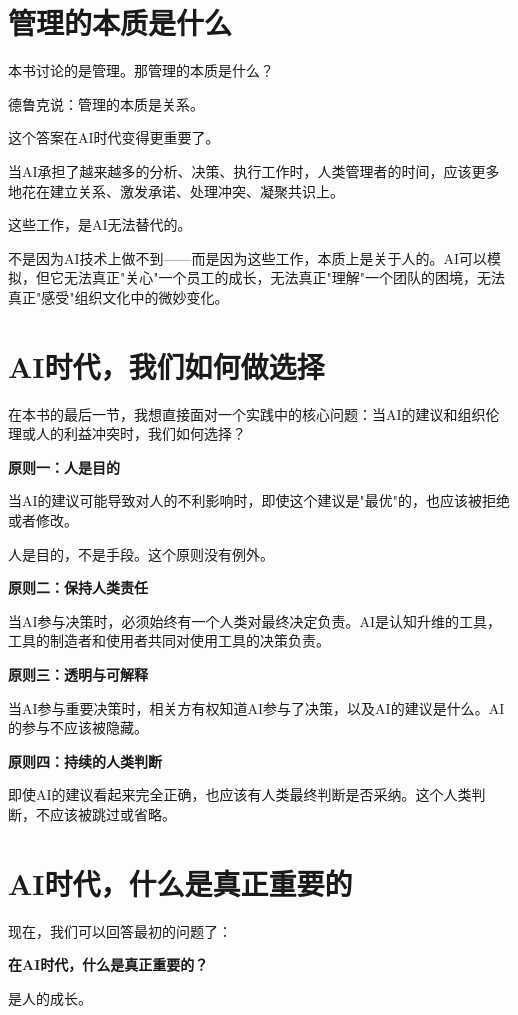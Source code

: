 \section{管理的本质是什么}


本书讨论的是管理。那管理的本质是什么？

德鲁克说：管理的本质是关系。

这个答案在AI时代变得更重要了。

当AI承担了越来越多的分析、决策、执行工作时，人类管理者的时间，应该更多地花在建立关系、激发承诺、处理冲突、凝聚共识上。

这些工作，是AI无法替代的。

不是因为AI技术上做不到——而是因为这些工作，本质上是关于人的。AI可以模拟，但它无法真正"关心"一个员工的成长，无法真正"理解"一个团队的困境，无法真正"感受"组织文化中的微妙变化。

\section{AI时代，我们如何做选择}


在本书的最后一节，我想直接面对一个实践中的核心问题：当AI的建议和组织伦理或人的利益冲突时，我们如何选择？

\textbf{原则一：人是目的}

当AI的建议可能导致对人的不利影响时，即使这个建议是"最优"的，也应该被拒绝或者修改。

人是目的，不是手段。这个原则没有例外。

\textbf{原则二：保持人类责任}

当AI参与决策时，必须始终有一个人类对最终决定负责。AI是认知升维的工具，工具的制造者和使用者共同对使用工具的决策负责。

\textbf{原则三：透明与可解释}

当AI参与重要决策时，相关方有权知道AI参与了决策，以及AI的建议是什么。AI的参与不应该被隐藏。

\textbf{原则四：持续的人类判断}

即使AI的建议看起来完全正确，也应该有人类最终判断是否采纳。这个人类判断，不应该被跳过或省略。

\section{AI时代，什么是真正重要的}


现在，我们可以回答最初的问题了：

\textbf{在AI时代，什么是真正重要的？}

是人的成长。

